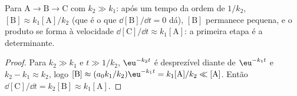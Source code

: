\begin{proposition}\label{prop:b1:elementary-steps:qssa-justified}
Para $\mathrm{A} \to \mathrm{B} \to \mathrm{C}$ com $k_2 \gg k_1$: após
um tempo da ordem de $1/k_2$, $[\mathrm{B}] \approx k_1[\mathrm{A}]/k_2$
(que é o que $\dd[\mathrm{B}]/\dd t = 0$ dá), $[\mathrm{B}]$ permanece
pequena, e o produto se forma à velocidade $\dd[\mathrm{C}]/\dd t \approx k_1[\mathrm{A}]$:
a primeira etapa é a determinante.
\end{proposition}

\begin{proof}
Para $k_2 \gg k_1$ e $t \gg 1/k_2$, $\eu^{-k_2t}$ é desprezível diante
de $\eu^{-k_1t}$ e $k_2 - k_1 \approx k_2$, logo $[\mathrm{B}] \approx (a_0k_1/k_2)
\eu^{-k_1t} = k_1[\mathrm{A}]/k_2 \ll [\mathrm{A}]$. Então
$\dd[\mathrm{C}]/\dd t = k_2[\mathrm{B}] \approx k_1[\mathrm{A}]$.
\end{proof}

